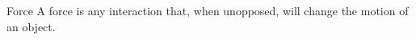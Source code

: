 \documentclass[preview]{standalone}
\begin{document}
\begin{defn*}{Force}
A force is any interaction that, when unopposed, will change the motion of an object.
\end{defn*}
\end{document}
